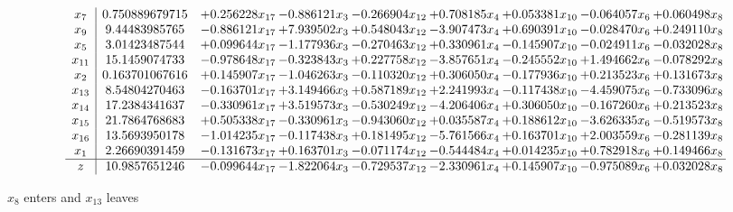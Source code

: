 \documentclass[10pt]{article}
\begin{document}
 \[\begin{array}{c| c c@{\hskip 2pt} c@{\hskip 2pt} c@{\hskip 2pt} c@{\hskip 2pt} c@{\hskip 2pt} c@{\hskip 2pt} c@{\hskip 2pt} }
 x_{7}   &  0.750889679715 & + 0.256228 x_{17} & -0.886121 x_{3} & -0.266904 x_{12} & + 0.708185 x_{4} & + 0.053381 x_{10} & -0.064057 x_{6} & + 0.060498 x_{8}\\
 x_{9}   &  9.44483985765 & -0.886121 x_{17} & + 7.939502 x_{3} & + 0.548043 x_{12} & -3.907473 x_{4} & + 0.690391 x_{10} & -0.028470 x_{6} & + 0.249110 x_{8}\\
 x_{5}   &  3.01423487544 & + 0.099644 x_{17} & -1.177936 x_{3} & -0.270463 x_{12} & + 0.330961 x_{4} & -0.145907 x_{10} & -0.024911 x_{6} & -0.032028 x_{8}\\
 x_{11}   &  15.1459074733 & -0.978648 x_{17} & -0.323843 x_{3} & + 0.227758 x_{12} & -3.857651 x_{4} & -0.245552 x_{10} & + 1.494662 x_{6} & -0.078292 x_{8}\\
 x_{2}   &  0.163701067616 & + 0.145907 x_{17} & -1.046263 x_{3} & -0.110320 x_{12} & + 0.306050 x_{4} & -0.177936 x_{10} & + 0.213523 x_{6} & + 0.131673 x_{8}\\
 x_{13}   &  8.54804270463 & -0.163701 x_{17} & + 3.149466 x_{3} & + 0.587189 x_{12} & + 2.241993 x_{4} & -0.117438 x_{10} & -4.459075 x_{6} & -0.733096 x_{8}\\
 x_{14}   &  17.2384341637 & -0.330961 x_{17} & + 3.519573 x_{3} & -0.530249 x_{12} & -4.206406 x_{4} & + 0.306050 x_{10} & -0.167260 x_{6} & + 0.213523 x_{8}\\
 x_{15}   &  21.7864768683 & + 0.505338 x_{17} & -0.330961 x_{3} & -0.943060 x_{12} & + 0.035587 x_{4} & + 0.188612 x_{10} & -3.626335 x_{6} & -0.519573 x_{8}\\
 x_{16}   &  13.5693950178 & -1.014235 x_{17} & -0.117438 x_{3} & + 0.181495 x_{12} & -5.761566 x_{4} & + 0.163701 x_{10} & + 2.003559 x_{6} & -0.281139 x_{8}\\
 x_{1}   &  2.26690391459 & -0.131673 x_{17} & + 0.163701 x_{3} & -0.071174 x_{12} & -0.544484 x_{4} & + 0.014235 x_{10} & + 0.782918 x_{6} & + 0.149466 x_{8}\\
\hline
z    &  10.9857651246 & -0.099644 x_{17} & -1.822064 x_{3} & -0.729537 x_{12} & -2.330961 x_{4} & + 0.145907 x_{10} & -0.975089 x_{6} & + 0.032028 x_{8}\\
\end{array}\]


 $ x_{8} $ enters and $ x_{13} $ leaves 
\end{document}
